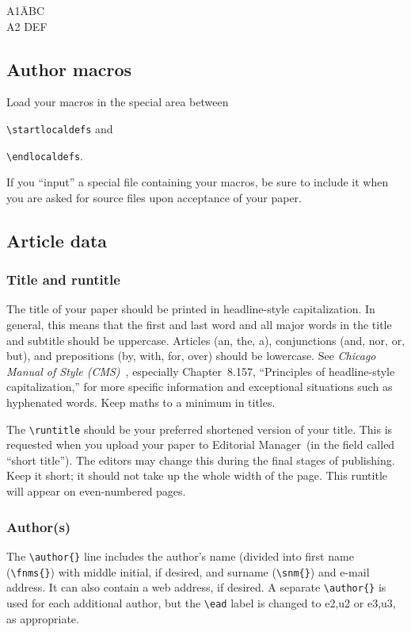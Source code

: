 \documentclass{ndjflart}
\theoremstyle{definition}
\theoremstyle{remark}
\newcommand{\EM}{Editorial Manager}
\newcommand{\mn}{\medskip\noindent}
\begin{document}
\begin{tabbing}
  A1\quad \= ABC\\
  A2\> DEF
\end{tabbing} 

\subsection{Author macros}\label{macros} Load your macros in the
special area between

\mn \verb=\startlocaldefs= and

\mn \verb=\endlocaldefs=.

\mn If you ``input'' a special file containing your macros, be sure to
include it when you are asked for source files upon acceptance of your
paper.

\subsection{Article data}

\subsubsection{Title and runtitle}\label{tandr} The title of your paper should be
printed in headline-style capitalization. In general, this means that
the first and last word and all major words in the title and subtitle
should be uppercase. Articles (an, the, a), conjunctions (and, nor,
or, but), and prepositions (by, with, for, over) should be lowercase.
See \emph{Chicago Manual of Style (CMS)}~\cite{CMS}, especially
Chapter~8.157, ``Principles of headline-style capitalization,'' for
more specific information and exceptional situations such as
hyphenated words.  Keep maths to a minimum in titles.

The \verb=\runtitle= should be your preferred shortened version of
your title.  This is requested when you upload your paper to \EM\ (in
the field called ``short title''). The editors may change this during
the final stages of publishing.  Keep it short; it should not take up
the whole width of the page.  This runtitle will appear on
even-numbered pages.

\subsubsection{Author(s)}\label{authordata} The \verb=\author{}= line
includes the author's name (divided into first name (\verb=\fnms{}=)
with middle initial, if desired, and surname (\verb=\snm{}=) and
e-mail address.  It can also contain a web address, if desired.  A
separate \verb=\author{}= is used for each additional author, but the
\verb=\ead= label is changed to e2,u2 or e3,u3, as appropriate.
\end{document}

